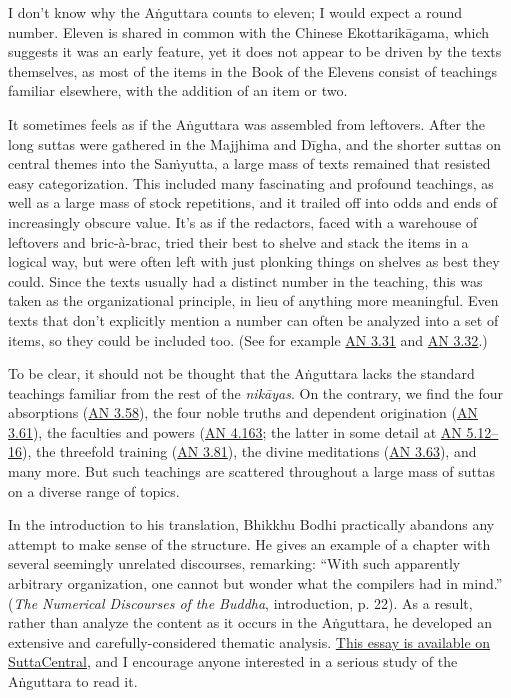 \documentclass[12pt,openany]{book}%
\begin{document}
I don’t know why the \textsanskrit{Aṅguttara} counts to eleven; I would expect a round number. Eleven is shared in common with the Chinese \textsanskrit{Ekottarikāgama}, which suggests it was an early feature, yet it does not appear to be driven by the texts themselves, as most of the items in the Book of the Elevens consist of teachings familiar elsewhere, with the addition of an item or two.

It sometimes feels as if the \textsanskrit{Aṅguttara} was assembled from leftovers. After the long suttas were gathered in the Majjhima and \textsanskrit{Dīgha}, and the shorter suttas on central themes into the \textsanskrit{Saṁyutta}, a large mass of texts remained that resisted easy categorization. This included many fascinating and profound teachings, as well as a large mass of stock repetitions, and it trailed off into odds and ends of increasingly obscure value. It’s as if the redactors, faced with a warehouse of leftovers and bric-à-brac, tried their best to shelve and stack the items in a logical way, but were often left with just plonking things on shelves as best they could. Since the texts usually had a distinct number in the teaching, this was taken as the organizational principle, in lieu of anything more meaningful. Even texts that don’t explicitly mention a number can often be analyzed into a set of items, so they could be included too. (See for example \href{https://suttacentral.net/an3.31}{AN 3.31} and \href{https://suttacentral.net/an3.32}{AN 3.32}.)

To be clear, it should not be thought that the \textsanskrit{Aṅguttara} lacks the standard teachings familiar from the rest of the \textit{\textsanskrit{nikāyas}}. On the contrary, we find the four absorptions (\href{https://suttacentral.net/an3.58}{AN 3.58}), the four noble truths and dependent origination (\href{https://suttacentral.net/an3.61}{AN 3.61}), the faculties and powers (\href{https://suttacentral.net/an4.163}{AN 4.163}; the latter in some detail at \href{https://suttacentral.net/an5.12}{AN 5.12–16}), the threefold training (\href{https://suttacentral.net/an3.81}{AN 3.81}), the divine meditations (\href{https://suttacentral.net/an3.63}{AN 3.63}), and many more. But such teachings are scattered throughout a large mass of suttas on a diverse range of topics.

In the introduction to his translation, Bhikkhu Bodhi practically abandons any attempt to make sense of the structure. He gives an example of a chapter with several seemingly unrelated discourses, remarking: “With such apparently arbitrary organization, one cannot but wonder what the compilers had in mind.” (\textit{The Numerical Discourses of the Buddha}, introduction, p. 22). As a result, rather than analyze the content as it occurs in the \textsanskrit{Aṅguttara}, he developed an extensive and carefully-considered thematic analysis. \href{https://suttacentral.net/an{-}introduction{-}bodhi}{This essay is available on SuttaCentral}, and I encourage anyone interested in a serious study of the \textsanskrit{Aṅguttara} to read it.
\end{document}
